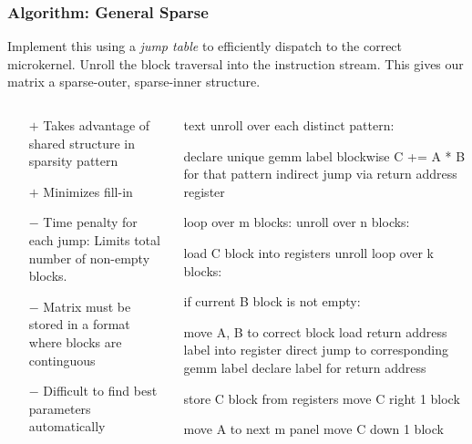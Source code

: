 \documentclass[9pt]{beamer}
\begin{document}
\begin{frame}[fragile]
  \frametitle{Algorithm: General Sparse}
  Implement this using a \emph{jump table} to efficiently dispatch to the correct microkernel. Unroll the block traversal into the instruction stream. This gives our matrix a sparse-outer, sparse-inner structure.


  \begin{columns}[t]%
    \begin{column}{0.4\textwidth}
      \begin{itemize}
  \item[$+$] Takes advantage of shared structure in sparsity pattern
  \item[$+$] Minimizes fill-in

  \item[$-$] Time penalty for each jump: Limits total number of non-empty blocks.
  \item[$-$] Matrix must be stored in a format where blocks are continguous
  \item[$-$] Difficult to find best parameters automatically
      \end{itemize}
    \end{column}
    \begin{column}{0.6\textwidth}
      \begin{ccode}[]
        {text}
        unroll over each distinct pattern:

           declare unique gemm label
           blockwise C += A * B for that pattern
           indirect jump via return address register

        loop over m blocks:
           unroll over n blocks:

              load C block into registers
              unroll loop over k blocks:

                 if current B block is not empty:

                    move A, B to correct block
                    load return address label into register
                    direct jump to corresponding gemm label
                    declare label for return address

              store C block from registers
              move C right 1 block

           move A to next m panel
           move C down 1 block
      \end{ccode}
    \end{column}
  \end{columns}

\end{frame}
\end{document}
